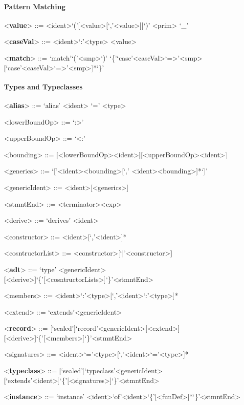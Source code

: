 \documentclass[11pt]{article} %
\begin{document}
\paragraph{Pattern Matching}

\begin{grammar}

<\textbf{value}> ::= <ident>`('[<value>[`,'<value>]]`)'
\alt <prim>
\alt `\_'

<\textbf{caseVal}> ::= <ident>`:'<type>
\alt <value>

<\textbf{match}> ::= `match'`('<smp>`)' `\{'`case'<caseVal>`=>'<smp>[`case'<caseVal>`=>'<smp>]*`\}'

\end{grammar}

\paragraph{Types and Typeclasses}

\begin{grammar}

<\textbf{alias}> ::= `alias' <ident> `=' <type>

<lowerBoundOp> ::= `:>'

<upperBoundOp> ::= `<:'

<bounding> ::= [<lowerBoundOp><ident>][<upperBoundOp><ident>]

<generics> ::= `['<ident><bounding>[`,' <ident><bounding>]*`]'

<genericIdent> ::= <ident>[<generics>]

<stmntEnd> ::= <terminator><exp>

<derive> ::= `derives' <ident>

<constructor> ::= <ident>[`,'<ident>]*

<cosntructorList> ::= <constructor>[`|'<constructor>]

<\textbf{adt}> ::= `type' <genericIdent>[<derive>]`\{'[<cosntructorLists>]`\}'<stmntEnd>

<members> ::= <ident>`:'<type>[`,'<ident>`:'<type>]*

<extend> ::= `extends'<genericIdent>

<\textbf{record}> ::= [`sealed']`record'<genericIdent>[<extend>][<derive>]`\{'[<members>]`\}'<stmntEnd>

<signatures> ::= <ident>`='<type>[`,'<ident>`='<type>]*
 
<\textbf{typeclass}> ::= [`sealed']`typeclass'<genericIdent>[`extends'<ident>]`\{'[<signatures>]`\}'<stmntEnd>

<\textbf{instance}> ::= `instance' <ident>`of'<ident>`\{'[<funDef>]*`\}'<stmntEnd>

\end{grammar}
\end{document}
